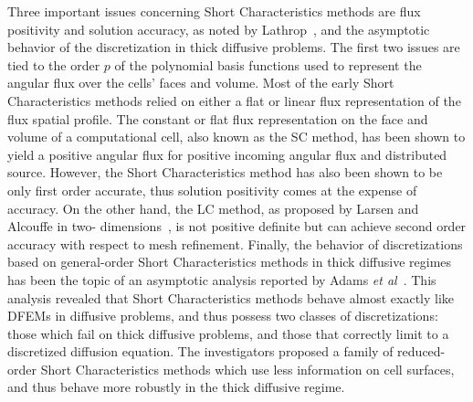 Three important issues concerning Short Characteristics methods are flux positivity and solution accuracy, as noted by Lathrop~\cite{Lathrop1969}, and the asymptotic behavior of the discretization in thick diffusive problems.
The first two  issues are tied to the order $p$ of the polynomial basis functions used to represent the angular flux over the cells’ faces and volume.
Most of the early Short Characteristics methods relied on either a flat or linear flux representation of the flux spatial profile.
The constant or flat flux representation on the face and volume of a computational cell, also known as the \ac{SC} method, has been shown to yield a positive angular flux for positive incoming angular flux and distributed source.
However, the Short Characteristics method has also been shown to be only first order accurate, thus solution positivity comes at the expense of accuracy.
On the other hand, the \ac{LC} method, as proposed by Larsen and Alcouffe in two- dimensions~\cite{Larsen1981}, is not positive definite but can achieve second order accuracy with respect to mesh refinement.
Finally, the behavior of discretizations based on general-order Short Characteristics methods in thick diffusive regimes has been the topic of an asymptotic analysis reported by Adams \textit{et al}~\cite{Adams1998}.
This analysis revealed that Short Characteristics methods behave almost exactly like \acs{DFEM}s in diffusive problems, and thus possess two classes of discretizations: those which fail on thick diffusive problems, and those that correctly limit to a discretized diffusion equation.
The investigators proposed a family of reduced-order Short Characteristics methods which use less information on cell surfaces, and thus behave more robustly in the thick diffusive regime.

